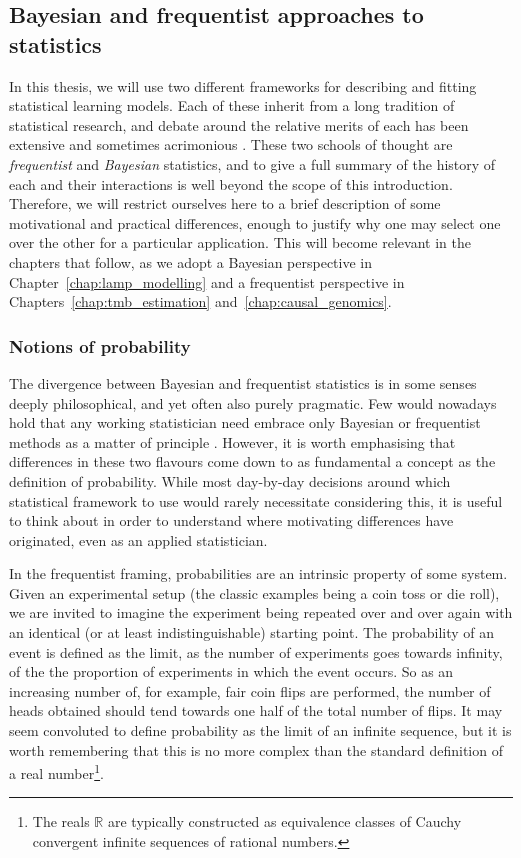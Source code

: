 \documentclass[thesis.tex]{subfiles}
\begin{document}
\subsection{Bayesian and frequentist approaches to statistics}
In this thesis, we will use two different frameworks for describing and fitting statistical learning models. Each of these inherit from a long tradition of statistical research, and debate around the relative merits of each has been extensive and sometimes acrimonious \citep{bayarri_interplay_2004, coles_bayesians_2006, vallverdu_bayesians_2016}. These two schools of thought are \emph{frequentist} and \emph{Bayesian} statistics, and to give a full summary of the history of each and their interactions is well beyond the scope of this introduction. Therefore, we will restrict ourselves here to a brief description of some motivational and practical differences, enough to justify why one may select one over the other for a particular application. This will become relevant in the chapters that follow, as we adopt a Bayesian perspective in Chapter~\ref{chap:lamp_modelling} and a frequentist perspective in Chapters~\ref{chap:tmb_estimation} and~\ref{chap:causal_genomics}.

\subsubsection{Notions of probability}
The divergence between Bayesian and frequentist statistics is in some senses deeply philosophical, and yet often also purely pragmatic. Few would nowadays hold that any working statistician need embrace only Bayesian or frequentist methods as a matter of principle \citep{gelman_holes_2021, bon_being_2023}. However, it is worth emphasising that differences in these two flavours come down to as fundamental a concept as the definition of probability. While most day-by-day decisions around which statistical framework to use would rarely necessitate considering this, it is useful to think about in order to understand where motivating differences have originated, even as an applied statistician.

In the frequentist framing, probabilities are an intrinsic property of some system. Given an experimental setup (the classic examples being a coin toss or die roll), we are invited to imagine the experiment being repeated over and over again with an identical (or at least indistinguishable) starting point. The probability of an event is defined as the limit, as the number of experiments goes towards infinity, of the the proportion of experiments in which the event occurs. So as an increasing number of, for example, fair coin flips are performed, the number of heads obtained should tend towards one half of the total number of flips. It may seem convoluted to define probability as the limit of an infinite sequence, but it is worth remembering that this is no more complex than the standard definition of a real number\footnote{The reals $\mathbb{R}$ are typically constructed as equivalence classes of Cauchy convergent infinite sequences of rational numbers.}.
\end{document}
